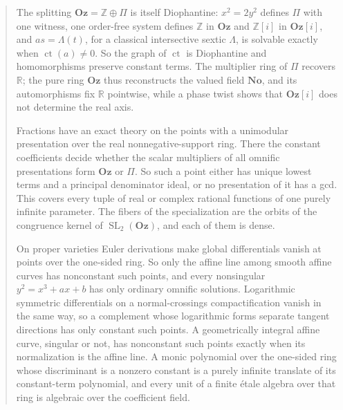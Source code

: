 \documentclass[11pt,oneside]{article}
\numberwithin{equation}{section}
\theoremstyle{definition}
\theoremstyle{remark}
\newcommand{\No}{\mathbf{No}}
\newcommand{\Oz}{\mathbf{Oz}}
\newcommand{\Z}{\mathbb Z}
\newcommand{\R}{\mathbb R}
\newcommand{\ct}{\operatorname{ct}}
\newcommand{\SL}{\operatorname{SL}}
\begin{document}
\begin{titlepage}
\begin{minipage}{\textwidth}
\begin{abstract}
The splitting $\Oz=\Z\oplus\Pi$ is itself Diophantine: $x^2=2y^2$ defines
$\Pi$ with one witness, one order-free system defines $\Z$ in $\Oz$ and $\Z[i]$
in $\Oz[i]$, and $as=\Lambda(t)$, for a classical intersective sextic
$\Lambda$, is solvable exactly when $\ct(a)\ne0$. So the graph of $\ct$ is
Diophantine and homomorphisms preserve constant terms. The multiplier ring of
$\Pi$ recovers $\R$; the pure ring $\Oz$ thus reconstructs the valued field
$\No$, and its automorphisms fix $\R$ pointwise, while a phase twist shows that
$\Oz[i]$ does not determine the real axis.

Fractions have an exact theory on the points with a unimodular presentation
over the real nonnegative-support ring. There the constant coefficients decide
whether the scalar multipliers of all omnific presentations form $\Oz$ or $\Pi$.
So such a point either has unique lowest terms and a principal denominator
ideal, or no presentation of it has a gcd. This covers every tuple of real or
complex rational functions of one purely infinite parameter. The fibers of the
specialization are the orbits of the congruence kernel of $\SL_2(\Oz)$, and
each of them is dense.

On proper varieties Euler derivations make global differentials vanish at points
over the one-sided ring. So only the affine line among smooth affine curves has
nonconstant such points, and every nonsingular $y^2=x^3+ax+b$ has only ordinary
omnific solutions. Logarithmic symmetric differentials on a normal-crossings
compactification vanish in the same way, so a complement whose logarithmic forms
separate tangent directions has only constant such points. A geometrically integral
affine curve, singular or not, has nonconstant such points exactly when its
normalization is the affine line.
A monic polynomial over the one-sided ring whose discriminant is a nonzero constant is a
purely infinite translate of its constant-term polynomial, and every unit of a finite
\'etale algebra over that ring is algebraic over the coefficient field.


\end{abstract}
\end{minipage}
\end{titlepage}
\end{document}
